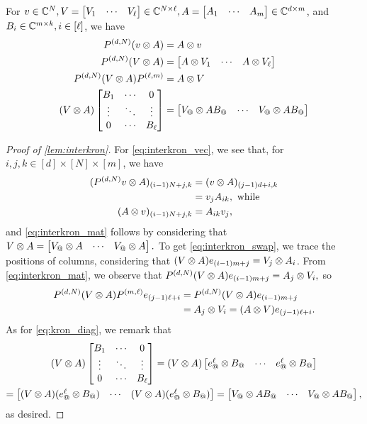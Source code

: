 \begin{lemma}
  For $v \in \mathbb{C}^N, V = \begin{bmatrix} V_{1} & \cdots & V_{\ell} \end{bmatrix} \in \mathbb{C}^{N \times \ell}, A = \begin{bmatrix} A_{1} & \cdots & A_{m} \end{bmatrix} \in \mathbb{C}^{d \times m}$, and $B_i \in \mathbb{C}^{m \times k}, i \in [\ell]$, we have
  \begin{align}
    P^{(d, N)} (v \kron A) &= A \kron v
    \label{eq:interkron_vec} \\
    P^{(d, N)} (V \kron A) &= \rowmat{A \kron V}{1}{\ell}
    \label{eq:interkron_mat} \\
    P^{(d, N)} (V \kron A) P^{(\ell, m)} &= A \kron V
    \label{eq:interkron_swap} \\
    (V \kron A) \diagmat{B}{1}{\ell} &= \rowmatfun{V_@ \kron A B_@}{1}{\ell}
    \label{eq:kron_diag}
  \end{align}
  \label{lem:interkron}
\end{lemma}

\begin{proof}[Proof of \cref{lem:interkron}]
  For \eqref{eq:interkron_vec}, we see that, for $i, j, k \in [d] \times [N] \times [m]$, we have
  \begin{align*}
    (P^{(d, N)} v \otimes A)_{(i - 1) N + j, k} &= (v \otimes A)_{(j - 1) d + i, k} \\
    &= v_j A_{i k}, \ \text{while} \\
    (A \otimes v)_{(i - 1) N + j, k} &= A_{i k} v_j,
  \end{align*}
  and \eqref{eq:interkron_mat} follows by considering that $V \otimes A = \rowmatfun{V_@ \kron A}{1}{\ell}.$  To get \eqref{eq:interkron_swap}, we trace the positions of columns, considering that $(V \otimes A) e_{(i - 1) m + j} = V_j \otimes A_i$.  From \eqref{eq:interkron_mat}, we observe that $P^{(d, N)} (V \otimes A) e_{(i - 1) m + j} = A_j \otimes V_i,$ so \begin{align*}
    P^{(d, N)} (V \otimes A) P^{(m, \ell)} e_{(j - 1) \ell + i} &= P^{(d, N)} (V \otimes A) e_{(i - 1) m + j} \\
    &= A_j \otimes V_i = (A \otimes V) e_{(j - 1) \ell + i}.
  \end{align*}
 As for \eqref{eq:kron_diag}, we remark that \begin{gather*} (V \kron A) \diagmat{B}{1}{\ell}%
    = (V \kron A) \rowmatfun{e^\ell_@ \kron B_@}{1}{\ell}  \\ = \rowmatfun{(V \kron A) (e_@^\ell \kron B_@)}{1}{\ell} = \rowmatfun{V_@ \kron A B_@}{1}{\ell},\end{gather*} as desired.
\end{proof}

